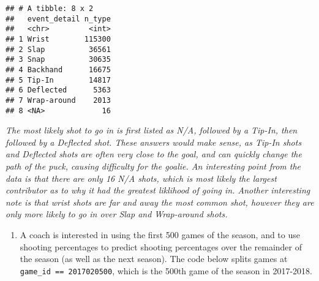 \documentclass[]{article}
\newenvironment{Shaded}{\begin{snugshade}}{\end{snugshade}}
\newcommand{\DataTypeTok}[1]{\textcolor[rgb]{0.13,0.29,0.53}{#1}}
\newcommand{\KeywordTok}[1]{\textcolor[rgb]{0.13,0.29,0.53}{\textbf{#1}}}
\newcommand{\NormalTok}[1]{#1}
\newcommand{\OperatorTok}[1]{\textcolor[rgb]{0.81,0.36,0.00}{\textbf{#1}}}
\newcommand{\StringTok}[1]{\textcolor[rgb]{0.31,0.60,0.02}{#1}}
\providecommand{\tightlist}{%
  \setlength{\itemsep}{0pt}\setlength{\parskip}{0pt}}
\begin{document}
\begin{Shaded}
\end{Shaded}

\begin{verbatim}
## # A tibble: 8 x 2
##   event_detail n_type
##   <chr>         <int>
## 1 Wrist        115300
## 2 Slap          36561
## 3 Snap          30635
## 4 Backhand      16675
## 5 Tip-In        14817
## 6 Deflected      5363
## 7 Wrap-around    2013
## 8 <NA>             16
\end{verbatim}

\emph{The most likely shot to go in is first listed as N/A, followed by
a Tip-In, then followed by a Deflected shot. These answers would make
sense, as Tip-In shots and Deflected shots are often very close to the
goal, and can quickly change the path of the puck, causing difficulty
for the goalie. An interesting point from the data is that there are
only 16 N/A shots, which is most likely the largest contributor as to
why it had the greatest liklihood of going in. Another interesting note
is that wrist shots are far and away the most common shot, however they
are only more likely to go in over Slap and Wrap-around shots.}

\begin{enumerate}
\def\labelenumi{\arabic{enumi}.}
\setcounter{enumi}{3}
\tightlist
\item
  A coach is interested in using the first 500 games of the season, and
  to use shooting percentages to predict shooting percentages over the
  remainder of the season (as well as the next season). The code below
  splits games at \texttt{game\_id\ ==\ 2017020500}, which is the 500th
  game of the season in 2017-2018.
\end{enumerate}
\end{document}

